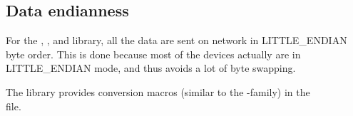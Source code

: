 \subsection*{Data endianness}

For the , ,  and  library, all the data are sent on network in LITTLE\_ENDIAN byte order. This is done because most of the devices actually are in LITTLE\_ENDIAN mode, and thus avoids a lot of byte swapping.

The  library provides conversion macros (similar to the -family) in the\\
 file.

